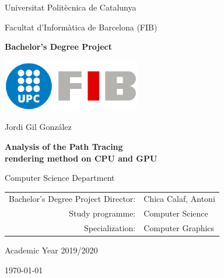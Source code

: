 \newcommand{\HRule}{\rule{\linewidth}{0.5mm}}

\thispagestyle{empty}

\begin{center}

{\large Universitat Politècnica de Catalunya}

\medskip
{\large Facultat d'Informàtica de Barcelona (FIB)}

\vfill
{\bfseries\Large Bachelor's Degree Project}

\vfill
\centerline{\mbox{\includegraphics[width=60mm]{media/FIB_UPC.png}}}

\vfill
\vspace{5mm}

{\LARGE Jordi Gil González}

\vspace{15mm}

{\LARGE\bfseries Analysis of the Path Tracing \\ rendering method on CPU and GPU}

\normalfont \small \sffamily{}

\vfill

Computer Science Department


\vfill

\begin{tabular}{rl}
Bachelor's Degree Project Director: & Chica Calaf, Antoni \\
\noalign{\vspace{2mm}}
Study programme: & Computer Science\\
\noalign{\vspace{2mm}}
Specialization: & Computer Graphics\\
\end{tabular}

\vfill

\large Academic Year 2019/2020

\large \today

\end{center}
